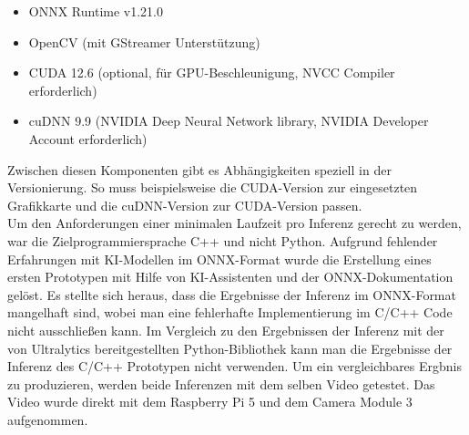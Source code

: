 \begin{itemize}
  \item ONNX Runtime v1.21.0
  \item OpenCV (mit GStreamer Unterstützung)
  \item CUDA 12.6 (optional, für GPU-Beschleunigung, NVCC Compiler erforderlich)
  \item cuDNN 9.9 (NVIDIA Deep Neural Network library, NVIDIA Developer Account erforderlich)
\end{itemize}

\newpage
Zwischen diesen Komponenten gibt es Abhängigkeiten speziell in der Versionierung. So muss beispielsweise die CUDA-Version zur eingesetzten Grafikkarte und die cuDNN-Version zur CUDA-Version passen. \\ Um den Anforderungen einer minimalen Laufzeit pro Inferenz gerecht zu werden, war die Zielprogrammiersprache C++ und nicht Python. Aufgrund fehlender Erfahrungen mit KI-Modellen im ONNX-Format wurde die Erstellung eines ersten Prototypen mit Hilfe von KI-Assistenten und der ONNX-Dokumentation gelöst. Es stellte sich heraus, dass die Ergebnisse der Inferenz im ONNX-Format mangelhaft sind, wobei man eine fehlerhafte Implementierung im C/C++ Code nicht ausschließen kann. Im Vergleich zu den Ergebnissen der Inferenz mit der von Ultralytics bereitgestellten Python-Bibliothek kann man die Ergebnisse der Inferenz des C/C++ Prototypen nicht verwenden. Um ein vergleichbares Ergbnis zu produzieren, werden beide Inferenzen mit dem selben Video getestet. Das Video wurde direkt mit dem Raspberry Pi 5 und dem Camera Module 3 aufgenommen.

